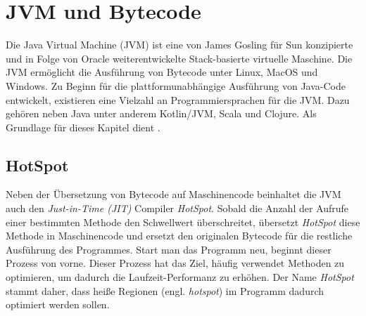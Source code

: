 \chapter{JVM und Bytecode}
\label{cha:jvm}

Die Java Virtual Machine (JVM) ist eine von James Gosling für Sun konzipierte und in Folge von Oracle weiterentwickelte Stack-basierte virtuelle Maschine. Die JVM ermöglicht die Ausführung von Bytecode unter Linux, MacOS und Windows. Zu Beginn für die plattformunabhängige Ausführung von Java-Code entwickelt, existieren eine Vielzahl an Programmiersprachen für die JVM. Dazu gehören neben Java unter anderem Kotlin/JVM, Scala und Clojure.
Als Grundlage für dieses Kapitel dient \textcite{lindholm2016java}.

\section{HotSpot}

Neben der Übersetzung von Bytecode auf Maschinencode beinhaltet die JVM auch den \textit{Just-in-Time (JIT)} Compiler \textit{HotSpot}. Sobald die Anzahl der Aufrufe einer bestimmten Methode den Schwellwert überschreitet, übersetzt \textit{HotSpot} diese Methode in Maschinencode und ersetzt den originalen Bytecode für die restliche Ausführung des Programmes. Start man das Programm neu, beginnt dieser Prozess von vorne. Dieser Prozess hat das Ziel, häufig verwendet Methoden zu optimieren, um dadurch die Laufzeit-Performanz zu erhöhen. Der Name \textit{HotSpot} stammt daher, dass heiße Regionen (engl. \textit{hotspot}) im Programm dadurch optimiert werden sollen.

